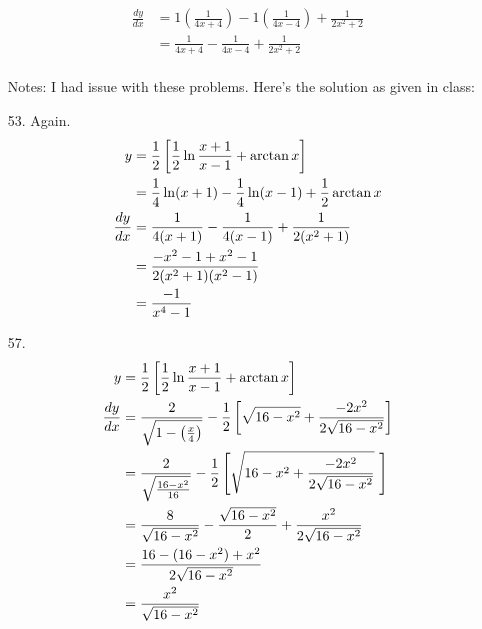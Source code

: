\documentclass[11pt]{article}
\begin{document}
\begin{enumerate}
\begin{align}
			\frac{dy}{dx} &= 1\left(\frac{1}{4x+4}\right) - 
			1\left(\frac{1}{4x-4}\right) + \frac{1}{2x^2+2} \\
			&= \frac{1}{4x+4} - \frac{1}{4x-4} + \frac{1}{2x^2+2}
		\end{align}
		\\ Notes: I had issue with these problems.  Here's the solution as
		given in class:
	\item[53. ] Again.
		\begin{align}
			\setcounter{equation}{0}
			y &= \frac{1}{2}\left[\frac{1}{2}\ln\frac{x+1}{x-1}+\arctan x\right] \\
			&= \frac{1}{4}\ln(x+1) - \frac{1}{4} \ln (x-1) + \frac{1}{2}\arctan x \\
			\frac{dy}{dx} &= \frac{1}{4(x+1)} - \frac{1}{4(x-1)}+\frac{1}{2(x^2+1)} \\
			&= \frac{-x^2-1+x^2-1}{2(x^2+1)(x^2-1)} \\
			&= \frac{-1}{x^4-1}
		\end{align}
	\item[57. ]
		\begin{align}
			\setcounter{equation}{0}
			y &= \frac{1}{2}\left[\frac{1}{2}\ln\frac{x+1}{x-1}+\arctan x\right] \\
			\frac{dy}{dx} &= \frac{2}{\sqrt{1-\left(\frac{x}{4}\right)}} 
			- \frac{1}{2}\left[\sqrt{16-x^2} + \frac{-2x^2}{2\sqrt{16-x^2}}\right] \\
			&= \frac{2}{\sqrt{\frac{16-x^2}{16}}} - \frac{1}{2}\left[\sqrt{16-x^2
			+ \frac{-2x^2}{2\sqrt{16-x^2}}}\ \right] \\
			&= \frac{8}{\sqrt{16-x^2}} - \frac{\sqrt{16-x^2}}{2} + \frac{x^2}
			{2\sqrt{16-x^2}} \\
			&= \frac{16 - (16-x^2)+x^2}{2\sqrt{16-x^2}} \\
			&= \frac{x^2}{\sqrt{16-x^2}}
		\end{align}
	\end{enumerate}
\end{document}
